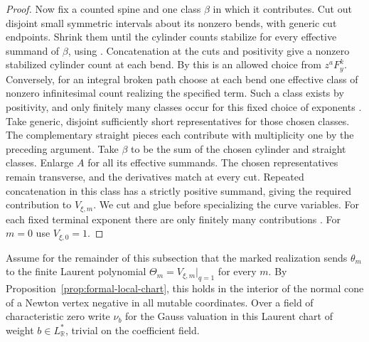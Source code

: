 \documentclass[11pt,reqno]{amsart}
\numberwithin{equation}{section}
\theoremstyle{definition}
\theoremstyle{remark}
\begin{document}
\begin{proof}
Now fix a counted spine and one class \(\beta\) in which it contributes.
Cut out disjoint small symmetric intervals about its nonzero bends,
with generic cut endpoints. Shrink them until the cylinder counts
stabilize for every effective summand of \(\beta\), using
\cite[Definition~20.2]{KY}. Concatenation at the cuts and positivity
give a nonzero stabilized cylinder count at each bend. By
\cite[Proposition~20.13 and Definition~20.32]{KY} this is an allowed
choice from \(z^aF_y^k\). Conversely, for an integral broken path
choose at each bend one effective class of nonzero infinitesimal
count realizing the specified term. Such a class exists by positivity,
and only finitely many classes occur for this fixed choice of
exponents \cite[Lemma~20.29]{KY}. Take generic, disjoint sufficiently
short representatives for those chosen classes. The complementary
straight pieces each contribute with multiplicity one by the preceding
argument. Take \(\beta\) to be the sum of the chosen cylinder and
straight classes. Enlarge \(A\) for all its effective summands.
The chosen representatives remain transverse, and the derivatives
match at every cut. Repeated concatenation in this class has a
strictly positive summand, giving the required contribution to
\(V_{\xi,m}\). We cut and glue before specializing the curve
variables. For each fixed terminal exponent there are only
finitely many contributions \cite[Proposition~20.21 and Lemma~20.31]{KY}. For
\(m=0\) use \(V_{\xi,0}=1\).
\end{proof}

Assume for the remainder of this subsection that the marked realization
sends \(\theta_m\) to the finite Laurent polynomial
\(\Theta_m=V_{\xi,m}|_{q=1}\) for every \(m\). By
Proposition~\ref{prop:formal-local-chart}, this holds in the interior
of the normal cone of a Newton vertex negative in all mutable
coordinates. Over a field of characteristic zero write \(\nu_b\) for the
Gauss valuation in this Laurent chart of weight \(b\in L^*_{\mathbb R}\),
trivial on the coefficient field.
\end{document}

